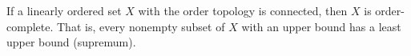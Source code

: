 If a linearly ordered set $X$ with the order topology is connected, then $X$ is order-complete. That is, every nonempty subset of $X$ with an upper bound has a least upper bound (supremum).

